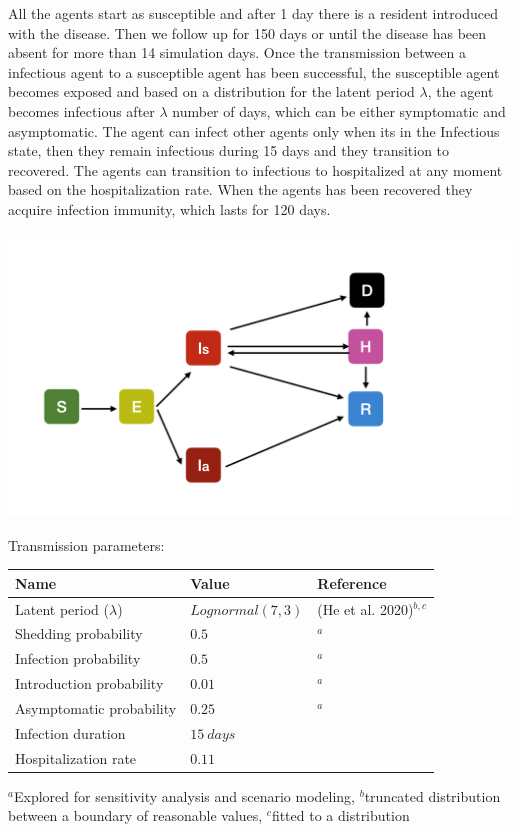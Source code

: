 \documentclass[
]{article}
\begin{document}
All the agents start as susceptible and after 1 day there is a resident
introduced with the disease. Then we follow up for 150 days or until the
disease has been absent for more than 14 simulation days. Once the
transmission between a infectious agent to a susceptible agent has been
successful, the susceptible agent becomes exposed and based on a
distribution for the latent period \(\lambda\), the agent becomes
infectious after \(\lambda\) number of days, which can be either
symptomatic and asymptomatic. The agent can infect other agents only
when its in the Infectious state, then they remain infectious during 15
days and they transition to recovered. The agents can transition to
infectious to hospitalized at any moment based on the hospitalization
rate. When the agents has been recovered they acquire infection
immunity, which lasts for 120 days.

\includegraphics{Figures/DiseaseDynamics}

Transmission parameters:

\begin{longtable}[]{@{}lll@{}}
\toprule
Name & Value & Reference\tabularnewline
\midrule
\endhead
Latent period (\(\lambda\)) & \(Lognormal(7, 3)\) & (He et al.
2020)\(^{b,c}\)\tabularnewline
Shedding probability & \(0.5\) & \(^a\)\tabularnewline
Infection probability & \(0.5\) & \(^a\)\tabularnewline
Introduction probability & \(0.01\) & \(^a\)\tabularnewline
Asymptomatic probability & \(0.25\) & \(^a\)\tabularnewline
Infection duration & \(15\ days\) &\tabularnewline
Hospitalization rate & \(0.11\) &\tabularnewline
\bottomrule
\end{longtable}

\(^a\)Explored for sensitivity analysis and scenario modeling,
\(^b\)truncated distribution between a boundary of reasonable values,
\(^c\)fitted to a distribution
\end{document}
